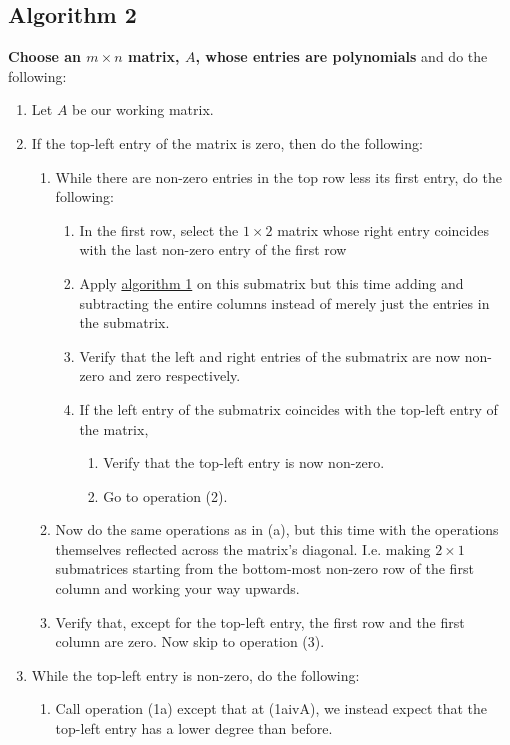 \documentclass[twocolumn]{article}
\begin{document}
		\subsection{Algorithm 2}\label{sec:algorithm 2}
			\textbf{Choose an $m\times n$ matrix, $A$, whose entries are polynomials} and do the following:
			\begin{enumerate}
				\item Let $A$ be our working matrix.
				\item If the top-left entry of the matrix is zero, then do the following:
					\begin{enumerate}
						\item While there are non-zero entries in the top row less its first entry, do the following:
						\begin{enumerate}
							\item In the first row, select the $1\times 2$ matrix whose right entry coincides with the last non-zero entry of the first row
							\item Apply \hyperref[sec:algorithm 1]{algorithm 1} on this submatrix but this time adding and subtracting the entire columns instead of merely just the entries in the submatrix.
							\item Verify that the left and right entries of the submatrix are now non-zero and zero respectively.
							\item If the left entry of the submatrix coincides with the top-left entry of the matrix,
							\begin{enumerate}
								\item Verify that the top-left entry is now non-zero.
								\item Go to operation (2).
							\end{enumerate}
						\end{enumerate}
						\item Now do the same operations as in (a), but this time with the operations themselves reflected across the matrix's diagonal. I.e. making $2\times 1$ submatrices starting from the bottom-most non-zero row of the first column and working your way upwards.
						\item Verify that, except for the top-left entry, the first row and the first column are zero. Now skip to operation (3).
					\end{enumerate}
				\item While the top-left entry is non-zero, do the following:
					\begin{enumerate}
						\item Call operation (1a) except that at (1aivA), we instead expect that the top-left entry has a lower degree than before.

\end{enumerate}
\end{enumerate}
\end{document}
